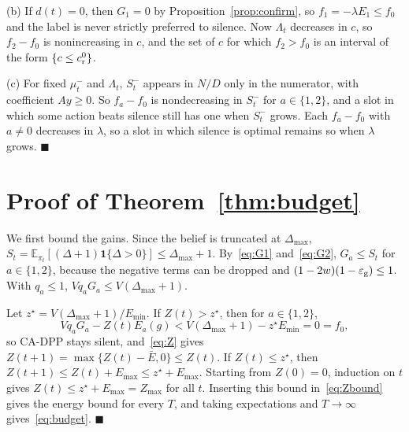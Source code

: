 \documentclass[5p,twocolumn]{elsarticle}
\theoremstyle{remark}
\newcommand{\E}{\mathbb{E}}
\newcommand{\ind}[1]{\mathbf{1}\{#1\}}
\newcommand{\ee}{\varepsilon}
\begin{document}
(b) If $d(t)=0$, then $G_1=0$ by Proposition~\ref{prop:confirm}, so $f_1=-\lambda E_1\le f_0$ and the label is never strictly preferred to silence. Now $\Lambda_t$ decreases in $c$, so $f_2-f_0$ is nonincreasing in $c$, and the set of $c$ for which $f_2>f_0$ is an interval of the form $\{c\le c^0_{\rm r}\}$.

(c) For fixed $\mu^-_t$ and $\Lambda_t$, $S^-_t$ appears in $N/D$ only in the numerator, with coefficient $Ay\ge0$. So $f_a-f_0$ is nondecreasing in $S^-_t$ for $a\in\{1,2\}$, and a slot in which some action beats silence still has one when $S^-_t$ grows. Each $f_a-f_0$ with $a\neq0$ decreases in $\lambda$, so a slot in which silence is optimal remains so when $\lambda$ grows. \hfill$\blacksquare$

\section{Proof of Theorem~\ref{thm:budget}}\label{app:budget}
We first bound the gains. Since the belief is truncated at $\Delta_{\max}$, $S_t=\E_{\pi_t}[(\Delta+1)\ind{\Delta>0}]\le\Delta_{\max}+1$. By~\eqref{eq:G1} and~\eqref{eq:G2}, $G_a\le S_t$ for $a\in\{1,2\}$, because the negative terms can be dropped and $(1-2w)(1-\ee_{\rm g})\le1$. With $q_a\le1$, $Vq_aG_a\le V(\Delta_{\max}+1)$.

Let $z^\star=V(\Delta_{\max}+1)/E_{\min}$. If $Z(t)>z^\star$, then for $a\in\{1,2\}$,
\[
Vq_aG_a-Z(t)E_a(g)<V(\Delta_{\max}+1)-z^\star E_{\min}=0=f_0,
\]
so CA-DPP stays silent, and~\eqref{eq:Z} gives $Z(t+1)=\max\{Z(t)-\bar E,0\}\le Z(t)$. If $Z(t)\le z^\star$, then $Z(t+1)\le Z(t)+E_{\max}\le z^\star+E_{\max}$. Starting from $Z(0)=0$, induction on $t$ gives $Z(t)\le z^\star+E_{\max}=Z_{\max}$ for all $t$. Inserting this bound in~\eqref{eq:Zbound} gives the energy bound for every $T$, and taking expectations and $T\to\infty$ gives~\eqref{eq:budget}. \hfill$\blacksquare$

\setlength{\bibsep}{0pt}


\end{document}
